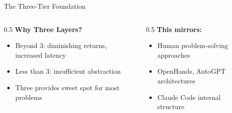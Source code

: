 \documentclass[aspectratio=169,11pt]{beamer}
\begin{document}
\begin{frame}{The Three-Tier Foundation}
    \vspace{0.3cm}
    \begin{columns}[T]
        \begin{column}{0.5\textwidth}
            \textbf{Why Three Layers?}
            \begin{itemize}
                \item Beyond 3: diminishing returns, increased latency
                \item Less than 3: insufficient abstraction
                \item Three provides sweet spot for most problems
            \end{itemize}
        \end{column}
        \begin{column}{0.5\textwidth}
            \textbf{This mirrors:}
            \begin{itemize}
                \item Human problem-solving approaches
                \item OpenHands, AutoGPT architectures
                \item Claude Code internal structure
            \end{itemize}
        \end{column}
    \end{columns}
\end{frame}
\end{document}
